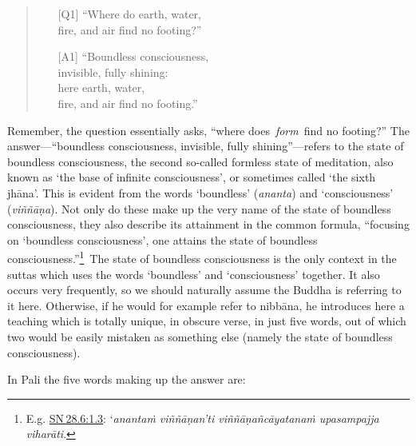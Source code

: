 \documentclass[10pt, openany]{book}
\begin{document}
\begin{quote}


\begin{itemize}

\item[{[Q1]}]“Where do earth, water, \\ fire, and air find no footing?”


\item[{[A1]}]“Boundless consciousness, \\ invisible, fully shining: \\ here earth, water, \\ fire, and air find no footing.”

\end{itemize}

\end{quote}
Remember, the question essentially asks, “where does \textit{form} find no footing?” The answer—“boundless consciousness, invisible, fully shining”—refers to the state of boundless consciousness, the second so-called formless state of meditation, also known as ‘the base of infinite consciousness’, or sometimes called ‘the sixth jhāna’. This is evident from the words ‘boundless’ (\textit{ananta}) and ‘consciousness’ (\textit{viññāṇa}). Not only do these make up the very name of the state of boundless consciousness, they also describe its attainment in the common formula, “focusing on ‘boundless consciousness’, one attains the state of boundless consciousness.”\footnote {E.g. \href{https://suttacentral.net/sn28.6/en/sujato\#1.3}{SN 28.6:1.3}: ‘\textit{anantaṁ viññāṇan’ti viññāṇañcāyatanaṁ upasampajja viharāti}.} The state of boundless consciousness is the only context in the suttas which uses the words ‘boundless’ and ‘consciousness’ together. It also occurs very frequently, so we should naturally assume the Buddha is referring to it here. Otherwise, if he would for example refer to nibbāna, he introduces here a teaching which is totally unique, in obscure verse, in just five words, out of which two would be easily mistaken as something else (namely the state of boundless consciousness).


In Pali the five words making up the answer are:
\end{document}
